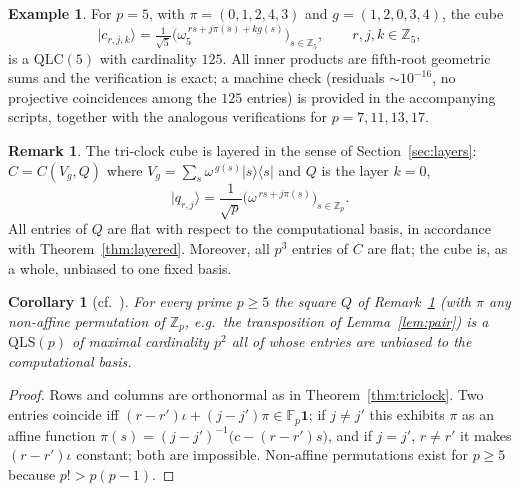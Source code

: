 \documentclass[11pt]{amsart}
\newtheorem{corollary}[theorem]{Corollary}
\theoremstyle{definition}
\newtheorem{remark}[theorem]{Remark}
\newtheorem{example}[theorem]{Example}
\newcommand{\Z}{\mathbb{Z}}
\newcommand{\F}{\mathbb{F}}
\newcommand{\ket}[1]{|#1\rangle}
\newcommand{\bra}[1]{\langle #1|}
\newcommand{\QLS}{\mathrm{QLS}}
\newcommand{\QLC}{\mathrm{QLC}}
\begin{document}
\begin{example}\label{ex:p5}
For $p=5$, with $\pi=(0,1,2,4,3)$ and $g=(1,2,0,3,4)$, the cube
\[
\ket{c_{r,j,k}}=\tfrac1{\sqrt5}
\bigl(\omega_5^{\,rs+j\pi(s)+kg(s)}\bigr)_{s\in\Z_5},
\qquad r,j,k\in\Z_5,
\]
is a $\QLC(5)$ with cardinality $125$.  All inner products are fifth-root
geometric sums and the verification is exact; a machine check (residuals
$\sim10^{-16}$, no projective coincidences among the $125$ entries) is
provided in the accompanying scripts, together with the analogous
verifications for $p=7,11,13,17$.
\end{example}

\begin{remark}\label{rem:layered-view}
The tri-clock cube is layered in the sense of Section~\ref{sec:layers}:
$C=C(V_g,Q)$ where $V_g=\sum_s\omega^{\,g(s)}\ket s\bra s$ and $Q$ is the
layer $k=0$,
\[
\ket{q_{r,j}}=\frac1{\sqrt p}\bigl(\omega^{\,rs+j\pi(s)}\bigr)_{s\in\Z_p}.
\]
All entries of $Q$ are flat with respect to the computational basis, in
accordance with Theorem~\ref{thm:layered}.  Moreover, all $p^3$ entries of
$C$ are flat; the cube is, as a whole, unbiased to one fixed basis.
\end{remark}

\begin{corollary}[{cf.\ \cite[Thm.~3.1]{ZZTS2025}}]\label{cor:flatqls}
For every prime $p\ge5$ the square $Q$ of Remark~\ref{rem:layered-view}
(with $\pi$ any non-affine permutation of $\Z_p$, e.g.\ the transposition
of Lemma~\ref{lem:pair}) is a $\QLS(p)$ of maximal cardinality $p^2$ all of
whose entries are unbiased to the computational basis.
\end{corollary}

\begin{proof}
Rows and columns are orthonormal as in Theorem~\ref{thm:triclock}.  Two
entries coincide iff $(r-r')\iota+(j-j')\pi\in\F_p\mathbf1$; if
$j\ne j'$ this exhibits $\pi$ as an affine function
$\pi(s)=(j-j')^{-1}\bigl(c-(r-r')s\bigr)$, and if $j=j'$, $r\ne r'$ it
makes $(r-r')\iota$ constant; both are impossible.  Non-affine
permutations exist for $p\ge5$ because $p!>p(p-1)$.
\end{proof}
\end{document}
